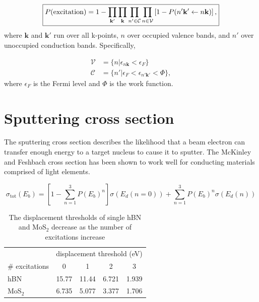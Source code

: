 \documentclass{article}
\begin{document}
\begin{equation}
\label{eq:fullProb}
\boxed{
    P(\text{excitation})
    =
    1- \prod_{\mathbf{k'}}\prod_{\mathbf{k}}
    \prod_{n'\in\mathcal{C}} \prod_{n\in\mathcal{V}}
    \left[
    1 - 
    P(n'\mathbf{k}'\leftarrow n\mathbf{k})
    \right],
    }
\end{equation}
%
where $\mathbf{k}$ and $\mathbf{k}'$ run over all k-points, $n$ over occupied valence bands, and $n'$ over unoccupied conduction bands.  Specifically,

\begin{equation}
\begin{aligned}
\mathcal{V} &= \{n | \epsilon_{n\mathbf{k}} < \epsilon_F\}
\\
\mathcal{C} &= \{n' | \epsilon_F < \epsilon_{n'\mathbf{k'}} < \Phi\},
\end{aligned}
\end{equation}
%
where $\epsilon_F$ is the Fermi level and $\Phi$ is the work function.






\section{Sputtering cross section}

The sputtering cross section describes the likelihood that a beam electron can transfer enough energy to a target nucleus to cause it to sputter.  The McKinley and Feshbach cross section has been shown to work well for conducting materials comprised of light elements.


\begin{equation}
    \sigma_\text{tot}(E_b)
    =
    \left[ 1 - \sum_{n=1}^3P(E_b)^n \right]
    \sigma\left(E_d(n=0)\right)
    +
    \sum_{n=1}^3
    P(E_b)^n
    \sigma\left(E_d(n)\right)
\end{equation}

\begin{table}[]
\centering
\begin{tabular}{lcccc}
\toprule
     & \multicolumn{4}{c}{displacement threshold (eV)}\\
     \cmidrule{2-5}
     \# excitations &0 &1 &2 &3 \\
     \midrule
     hBN &15.77 &11.44 & 6.721 &1.939\\
     MoS$_2$ &6.735 &5.077 &3.377 & 1.706\\
\bottomrule
\end{tabular}
\caption{The displacement thresholds of single hBN and MoS$_2$ decrease as the number of excitations increase}
\label{tab:Ed}
\end{table}
\end{document}
